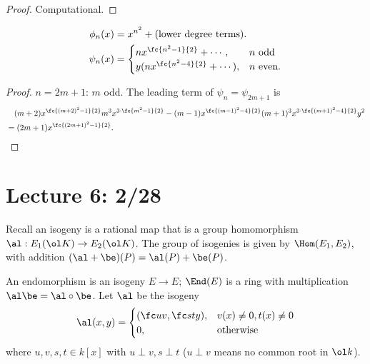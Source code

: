 \begin{proof}
Computational. %
\end{proof}
\begin{thm}
\begin{align*}
\phi_n(x)&=x^{n^2}+(\text{lower degree terms}).\\
\psi_n(x)&=\begin{cases}
nx^{\fc{n^2-1}{2}}+\cdots ,& n\text{ odd}\\
y(nx^{\fc{n^2-4}{2}}+\cdots ), & n\text{ even.}
\end{cases}
\end{align*}
\end{thm}
\begin{proof}
$n=2m+1$: $m$ odd. The leading term of $\psi_n=\psi_{2m+1}$ is
\begin{align*}
&\quad (m+2)x^{\fc{(m+2)^2-1}{2}}m^3x^{3\cdot \fc{m^2-1}{2}}-(m-1)x^{\fc{(m-1)^2-4}{2}}(m+1)^3 x^{3\cdot \fc{(m+1)^2-4}{2}}y^2\\
&= (2m+1)x^{\fc{(2m+1)^2-1}{2}}.
\end{align*}
\end{proof}
\section{Lecture 6: 2/28}
Recall an isogeny is a rational map that is a group homomorphism $\al:E_1(\ol K)\to E_2(\ol K)$. The group of isogenies is given by $\Hom(E_1,E_2)$, with addition $(\al+\be)(P)=\al(P)+\be(P)$.

An endomorphism is an isogeny $E\to E$; $\End(E)$ is a ring with multiplication $\al\be=\al\circ \be$. %
Let $\al$ be the isogeny
\[
\al(x,y)=\begin{cases}
(\fc uv,\fc sty),&v(x)\ne 0, t(x)\ne 0\\
0,&\text{otherwise}
\end{cases}\]
where $u,v,s,t\in k[x]$ with $u\perp v, s\perp t$ ($u\perp v$ means no common root in $\ol k$).

